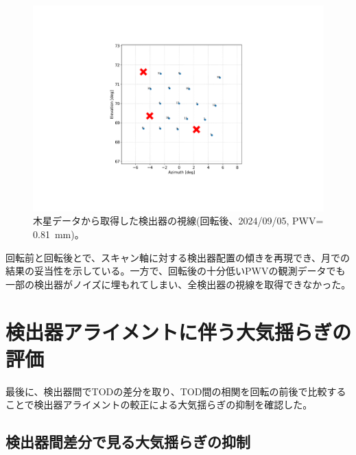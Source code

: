 \begin{figure}[htbp]
  \centering
  \includegraphics[width=0.7\columnwidth]{5_alignment/figs/11280_jupiter_pos_mod.pdf}
  \caption{木星データから取得した検出器の視線(回転後、2024/09/05, PWV= \SI{0.81}{mm})。}
  \label{11280_jupiter_pos}
\end{figure}
回転前と回転後とで、スキャン軸に対する検出器配置の傾きを再現でき、月での結果の妥当性を示している。一方で、回転後の十分低いPWVの観測データでも一部の検出器がノイズに埋もれてしまい、全検出器の視線を取得できなかった。
\chapter{検出器アライメントに伴う大気揺らぎの評価}
\label{chapter4_3}
最後に、検出器間でTODの差分を取り、TOD間の相関を回転の前後で比較することで検出器アライメントの較正による大気揺らぎの抑制を確認した。
\section{検出器間差分で見る大気揺らぎの抑制}

